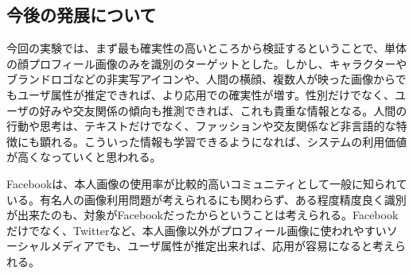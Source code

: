 \subsection{今後の発展について}
今回の実験では、まず最も確実性の高いところから検証するということで、単体の顔プロフィール画像のみを識別のターゲットとした。しかし、キャラクターやブランドロゴなどの非実写アイコンや、人間の横顔、複数人が映った画像からでもユーザ属性が推定できれば、より応用での確実性が増す。性別だけでなく、ユーザの好みや交友関係の傾向も推測できれば、これも貴重な情報となる。人間の行動や思考は、テキストだけでなく、ファッションや交友関係など非言語的な特徴にも顕れる。こういった情報も学習できるようになれば、システムの利用価値が高くなっていくと思われる。\par
Facebookは、本人画像の使用率が比較的高いコミュニティとして一般に知られている。有名人の画像利用問題が考えられるにも関わらず、ある程度精度良く識別が出来たのも、対象がFacebookだったからということは考えられる。Facebookだけでなく、Twitterなど、本人画像以外がプロフィール画像に使われやすいソーシャルメディアでも、ユーザ属性が推定出来れば、応用が容易になると考えられる。

